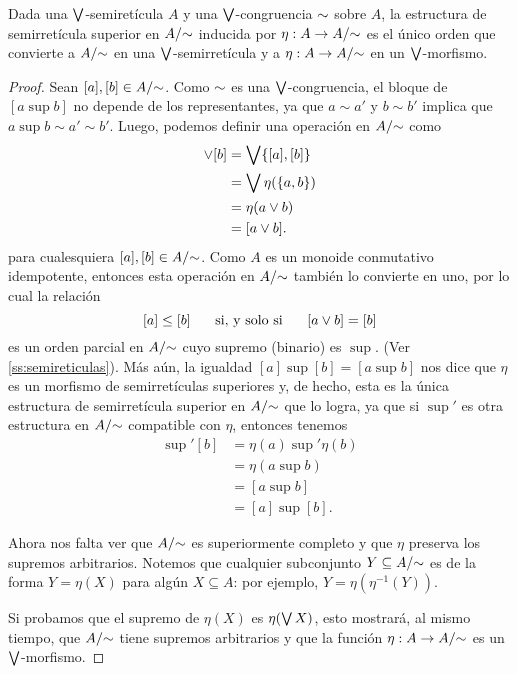 \begin{lemma}
  \label{lemma:congruencia-produce-cociente}
  Dada una $\bigvee$-semiretícula $A$ y una $\bigvee$-congruencia
  ${\sim}$ sobre $A$, la estructura de semirretícula superior en
  $A/{\sim}$ inducida por $\eta:A\to A/{\sim}$ es el único orden
  que convierte a $A/{\sim}$ en una $\bigvee$-semirretícula y
  a $\eta:A\to A/{\sim}$ en un $\bigvee$-morfismo.
\end{lemma}
\begin{proof}
  Sean $[a],[b]\in A/{\sim}$.
  Como ${\sim}$ es una $\bigvee$-congruencia, el bloque de
  $[a\sup b]$ no depende de los representantes,
  ya que $a\sim a'$ y $b\sim b'$ implica
  que $a\sup b\sim a'\sim b'$.
  Luego, podemos definir una operación en $A/{\sim}$ como
  \begin{align*}
      [a]\sup[b]
      &= \Sup\{[a],[b]\} \\
      &= \Sup\eta(\{a,b\}) \\
      &= \eta(a\sup b) \\
      &= [a\sup b].
  \end{align*}
  para cualesquiera $[a],[b]\in A/{\sim}$.
  Como $A$ es un monoide conmutativo idempotente, entonces esta
  operación en $A/{\sim}$ también lo convierte en uno,
  por lo cual la relación
  \[
      [a]\leq[b] \hspace{5mm}\text{ si, y solo si }\hspace{5mm} [a\vee b]=[b]
  \]
  es un orden parcial en $A/{\sim}$ cuyo supremo (binario) es
  $\sup$. (Ver \ref{ss:semireticulas}).
  Más aún, la igualdad $[a]\sup[b]=[a\sup b]$ nos dice que $\eta$
  es un morfismo de semirretículas superiores y, de hecho, esta
  es la única estructura de semirretícula superior en $A/{\sim}$
  que lo logra, ya que si $\sup'$ es otra estructura en $A/{\sim}$
  compatible con $\eta$, entonces tenemos
  \begin{align*}
    [a]\sup'[b]
    &= \eta(a)\sup'\eta(b) \\
    &= \eta(a\sup b) \\
    &= [a\sup b] \\
    &= [a]\sup[b].
  \end{align*}
  
  Ahora nos falta ver que $A/{\sim}$ es superiormente completo
  y que $\eta$ preserva los supremos arbitrarios.
  Notemos que cualquier subconjunto $Y\subseteq A/{\sim}$ es de la
  forma $Y=\eta(X)$ para algún $X\subseteq A$: por ejemplo,
  $Y=\eta(\eta^{-1}(Y))$.

  Si probamos que el supremo de $\eta(X)$ es $\eta(\bigvee X)$,
  esto mostrará, al mismo tiempo, que $A/{\sim}$ tiene supremos
  arbitrarios y que la función $\eta:A\to A/{\sim}$ es un
  $\bigvee$-morfismo.
  

\end{proof}
